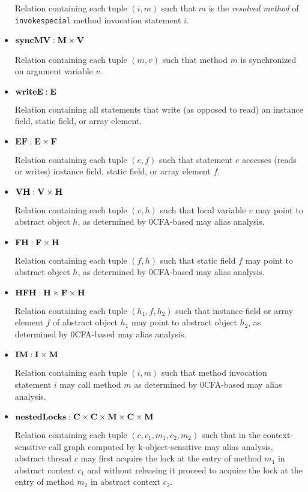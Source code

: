 \documentclass{article}
\providecommand\Mdom{{\bf M}}
\providecommand\Idom{{\bf I}}
\providecommand\Vdom{{\bf V}}
\providecommand\Hdom{{\bf H}}
\providecommand\Edom{{\bf E}}
\providecommand\Fdom{{\bf F}}
\providecommand\Cdom{{\bf C}}
\providecommand\EF{{\bf EF}}
\providecommand\writeE{{\bf writeE}}
\providecommand\syncMV{{\bf syncMV}}
\providecommand\nestedLocks{{\bf nestedLocks}}
\providecommand\VH{{\bf VH}}
\providecommand\FH{{\bf FH}}
\providecommand\HFH{{\bf HFH}}
\providecommand\IM{{\bf IM}}
\begin{document}
\begin{itemize}
Relation containing each tuple $(i,m)$ such that $m$ is the
{\it resolved method} of {\tt invokespecial} method invocation statement $i$.

\item
$\syncMV : \Mdom \times \Vdom$

Relation containing each tuple $(m,v)$ such that method $m$ is
synchronized on argument variable $v$.

\item
$\writeE : \Edom$

Relation containing all statements that write (as opposed to read)
an instance field, static field, or array element.

\item
$\EF : \Edom \times \Fdom$

Relation containing each tuple $(e,f)$ such that statement $e$
accesses (reads or writes) instance field, static field, or
array element $f$.

\item
$\VH : \Vdom \times \Hdom$

Relation containing each tuple $(v,h)$ such that local variable $v$
may point to abstract object $h$, as determined by 0CFA-based may
alias analysis.

\item
$\FH : \Fdom \times \Hdom$

Relation containing each tuple $(f,h)$ such that static field $f$ may
point to abstract object $h$, as determined by 0CFA-based may alias
analysis.

\item

$\HFH : \Hdom \times \Fdom \times \Hdom$

Relation containing each tuple $(h_1,f,h_2)$ such that instance field
or array element $f$ of abstract object $h_1$ may point to abstract
object $h_2$, as determined by 0CFA-based may alias analysis.

\item
$\IM : \Idom \times \Mdom$

Relation containing each tuple $(i,m)$ such that method invocation
statement $i$ may call method $m$ as determined by 0CFA-based may alias
analysis.

\item
$\nestedLocks : \Cdom \times \Cdom \times \Mdom \times \Cdom \times \Mdom$

Relation containing each tuple $(c,c_1,m_1,c_2,m_2)$ such that in the
context-sensitive call graph computed by k-object-sensitive may
alias analysis, abstract thread $c$ may first acquire the lock at
the entry of method $m_1$ in abstract context $c_1$ and without
releasing it proceed to acquire the lock at the entry of method
$m_2$ in abstract context $c_2$.


\end{itemize}
\end{document}
